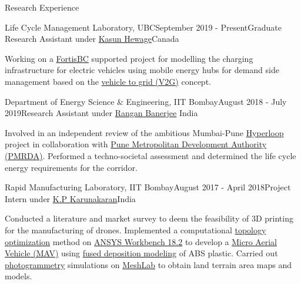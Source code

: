 \documentclass{resume} %
\begin{document}
\vspace*{-5mm}
\begin{rSection}{Research Experience}
\begin{rSubsection}{Life Cycle Management Laboratory, UBC}{September 2019 - Present}{Graduate Research Assistant under \href{https://engineering.ok.ubc.ca/about/contact/kasun-hewage/}{Kasun Hewage}}{Canada}
\item  Working on a \href{https://www.fortisbc.com/}{FortisBC} supported project for modelling the charging infrastructure for electric vehicles using mobile energy hubs for demand side management based on the \href{https://en.wikipedia.org/wiki/Vehicle-to-grid}{vehicle to grid (V2G)} concept. 
\end{rSubsection}
\vspace*{-2mm}
\begin{rSubsection}{Department of Energy Science \& Engineering, IIT Bombay}{August 2018 - July 2019}{Research Assistant under \href{http://www.ese.iitb.ac.in/~rb/}{Rangan Banerjee}}{ India}
\item  Involved in an independent review of the ambitious Mumbai-Pune \href{https://en.wikipedia.org/wiki/Hyperloop} {Hyperloop} project in collaboration with \href{http://www.pmrda.gov.in/}{Pune Metropolitan Development Authority (PMRDA)}. Performed a techno-societal assessment and determined the life cycle energy requirements for the corridor. 
\end{rSubsection}
\vspace*{-2mm}
\begin{rSubsection}{Rapid Manufacturing Laboratory, IIT Bombay}{August 2017 - April 2018}{Project Intern under \href{https://www.me.iitb.ac.in/?q=faculty/Prof.\%20K.\%20P.\%20Karunakaran}{K.P Karunakaran}}{India}
\item Conducted a literature and market survey to deem the feasibility of 3D printing for the manufacturing of drones. Implemented a computational \href{https://www.ansys.com/en-in/products/structures/topology-optimization}{topology optimization} method on \href{https://www.ansys.com/en-in/about-ansys/news-center/08-22-17-ansys-18-2-enhances-simulation-speed-accuracy}{ANSYS Workbench 18.2} to develop a \href{https://en.wikipedia.org/wiki/Micro_air_vehicle}{Micro Aerial Vehicle (MAV)} using \href{https://www.materialise.com/en/manufacturing/3d-printing-technology/fused-deposition-modeling}{fused deposition modeling} of ABS plastic. Carried out \href{https://en.wikipedia.org/wiki/Photogrammetry}{photogrammetry} simulations on \href{http://www.meshlab.net/}{MeshLab} to obtain land terrain area maps and models.


\end{rSubsection}
\end{rSection}
\end{document}

